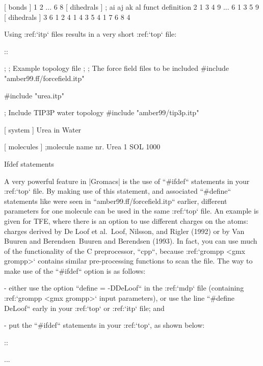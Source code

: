     [ bonds ]
        1	2
    ...
        6	8
    [ dihedrals ] 
    ;   ai    aj    ak    al funct  definition
         2     1     3     4   9     
    ...
         6     1     3     5   9     
    [ dihedrals ] 
         3     6     1     2   4     
         1     4     3     5   4	 
         1     7     6     8   4

Using :ref:`itp` files results in a very short
:ref:`top` file:

::

    ;
    ;       Example topology file
    ;
    ; The force field files to be included
    #include "amber99.ff/forcefield.itp"

    #include "urea.itp"

    ; Include TIP3P water topology
    #include "amber99/tip3p.itp"

    [ system ]
    Urea in Water

    [ molecules ]
    ;molecule name   nr.
    Urea             1
    SOL              1000

Ifdef statements
~~~~~~~~~~~~~~~~

A very powerful feature in |Gromacs| is the use of ``#ifdef``
statements in your :ref:`top` file. By making use of this
statement, and associated ``#define`` statements like were
seen in ``amber99.ff/forcefield.itp`` earlier,
different parameters for one molecule can be used in the same
:ref:`top` file. An example is given for TFE, where there is
an option to use different charges on the atoms: charges derived by De
Loof et al. Loof, Nilsson, and Rigler (1992) or by Van Buuren and
Berendsen Buuren and Berendsen (1993). In fact, you can use much of the
functionality of the C preprocessor, ``cpp``, because
:ref:`grompp <gmx grompp>` contains similar pre-processing functions to scan
the file. The way to make use of the ``#ifdef`` option is as
follows:

-  either use the option ``define = -DDeLoof`` in the
   :ref:`mdp` file (containing :ref:`grompp <gmx grompp>` input
   parameters), or use the line ``#define DeLoof`` early in
   your :ref:`top` or :ref:`itp` file; and

-  put the ``#ifdef`` statements in your
   :ref:`top`, as shown below:


::

    ...



